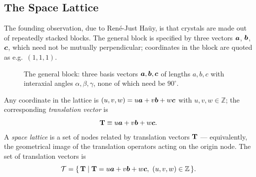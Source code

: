 \subsection{The Space Lattice}

The founding observation, due to René-Just Haüy, is that crystals are made out of repeatedly stacked blocks. The general block is specified by three vectors $\bm{a}$, $\bm{b}$, $\bm{c}$, which need not be mutually perpendicular; coordinates in the block are quoted as e.g.\ $(1,1,1)$.

\begin{figure}[ht]
\centering
{}
\caption{The general block: three basis vectors $\bm{a},\bm{b},\bm{c}$ of lengths $a,b,c$ with interaxial angles $\alpha,\beta,\gamma$, none of which need be $90^\circ$.}
\label{fig:xrd-block}
\end{figure}

\begin{definition}
Any coordinate in the lattice is $(u,v,w) = u\bm{a} + v\bm{b} + w\bm{c}$ with $u,v,w \in \mathbb{Z}$; the corresponding \emph{translation vector} is
\begin{equation}
    \cvect{T} \equiv u\lvect{a} + v\lvect{b} + w\lvect{c}.
\end{equation}
A \emph{space lattice} is a set of nodes related by translation vectors $\cvect{T}$ --- equivalently, the geometrical image of the translation operators acting on the origin node. The set of translation vectors is
\begin{equation}
    \mathcal{T} = \{\,\cvect{T} \mid \cvect{T} = u\lvect{a} + v\lvect{b} + w\lvect{c},\ (u,v,w)\in\mathbb{Z}\,\}.
\end{equation}
\end{definition}

